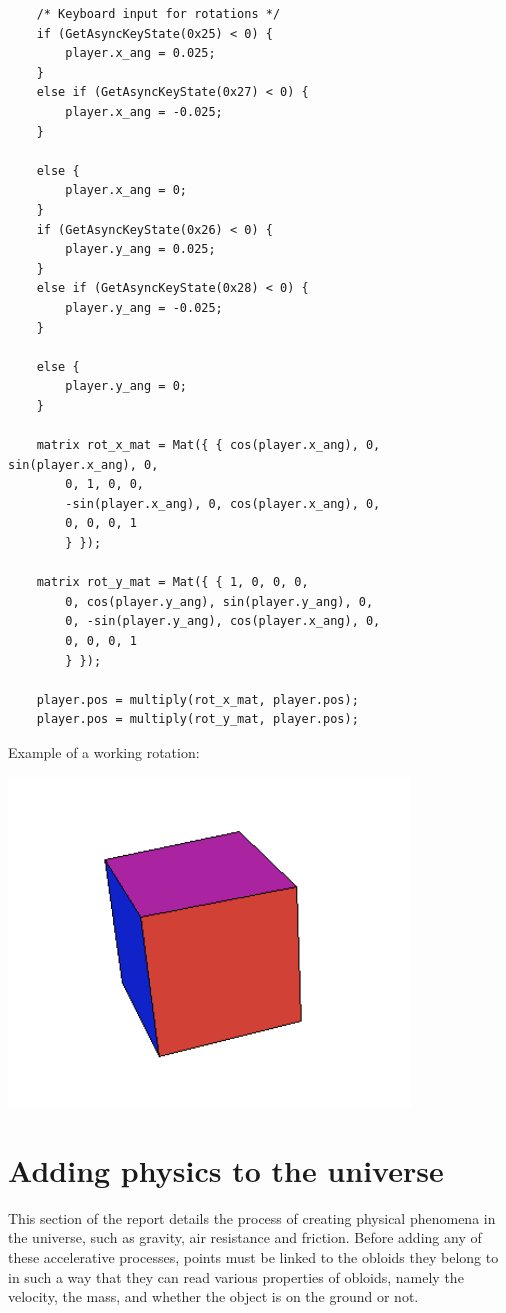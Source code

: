 \documentclass{article}
\begin{document}
\begin{lstlisting}
	/* Keyboard input for rotations */
	if (GetAsyncKeyState(0x25) < 0) {
		player.x_ang = 0.025;
	}
	else if (GetAsyncKeyState(0x27) < 0) {
		player.x_ang = -0.025;
	}

	else {
		player.x_ang = 0;
	}
	if (GetAsyncKeyState(0x26) < 0) {
		player.y_ang = 0.025;
	}
	else if (GetAsyncKeyState(0x28) < 0) {
		player.y_ang = -0.025;
	}

	else {
		player.y_ang = 0;
	}

	matrix rot_x_mat = Mat({ { cos(player.x_ang), 0, sin(player.x_ang), 0,
		0, 1, 0, 0,
		-sin(player.x_ang), 0, cos(player.x_ang), 0,
		0, 0, 0, 1
		} });

	matrix rot_y_mat = Mat({ { 1, 0, 0, 0,
		0, cos(player.y_ang), sin(player.y_ang), 0,
		0, -sin(player.y_ang), cos(player.x_ang), 0,
		0, 0, 0, 1
		} });

	player.pos = multiply(rot_x_mat, player.pos);
	player.pos = multiply(rot_y_mat, player.pos);
\end{lstlisting}
Example of a working rotation:
\newline
\begin{center}
\includegraphics[width=0.8\textwidth]{rotated_cube.png}
\end{center}
\section{Adding physics to the universe}
This section of the report details the process of creating physical phenomena in the universe, such as gravity, air resistance and friction. Before adding any of these accelerative processes, points must be linked to the obloids they belong to in such a way that they can read various properties of obloids, namely the velocity, the mass, and whether the object is on the ground or not.
\end{document}
